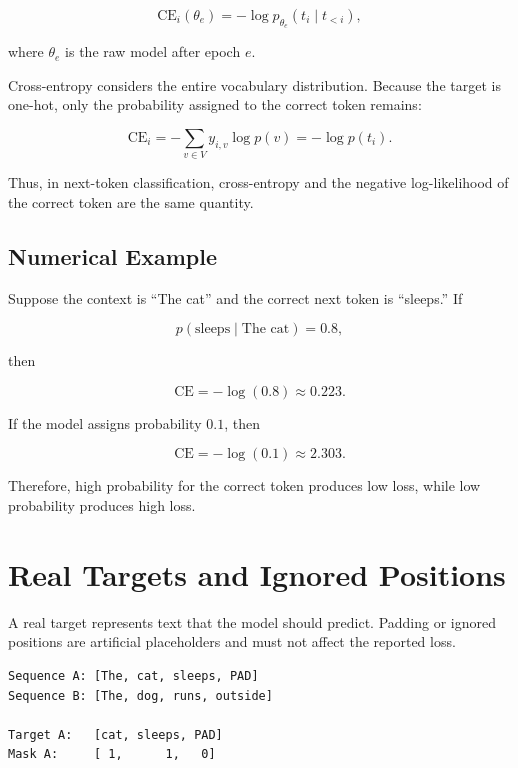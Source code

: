 \documentclass[11pt,a4paper]{article}
\begin{document}
\begin{equation}
  \mathrm{CE}_i(\theta_e)
  = -\log p_{\theta_e}(t_i\mid t_{<i}),
\end{equation}

where $\theta_e$ is the raw model after epoch $e$.

Cross-entropy considers the entire vocabulary distribution. Because the target
is one-hot, only the probability assigned to the correct token remains:

\begin{equation}
  \mathrm{CE}_i
  = -\sum_{v\in V}y_{i,v}\log p(v)
  = -\log p(t_i).
\end{equation}

Thus, in next-token classification, cross-entropy and the negative
log-likelihood of the correct token are the same quantity.

\subsection{Numerical Example}

Suppose the context is ``The cat'' and the correct next token is ``sleeps.'' If

\begin{equation}
  p(\text{sleeps}\mid\text{The cat})=0.8,
\end{equation}

then

\begin{equation}
  \mathrm{CE}=-\log(0.8)\approx 0.223.
\end{equation}

If the model assigns probability $0.1$, then

\begin{equation}
  \mathrm{CE}=-\log(0.1)\approx 2.303.
\end{equation}

Therefore, high probability for the correct token produces low loss, while low
probability produces high loss.

\section{Real Targets and Ignored Positions}

A real target represents text that the model should predict. Padding or ignored
positions are artificial placeholders and must not affect the reported loss.

\begin{lstlisting}
Sequence A: [The, cat, sleeps, PAD]
Sequence B: [The, dog, runs, outside]

Target A:   [cat, sleeps, PAD]
Mask A:     [ 1,      1,   0]
\end{lstlisting}
\end{document}
